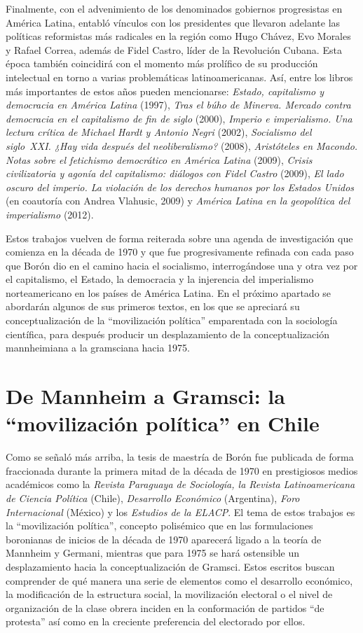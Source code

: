 {Finalmente, con el advenimiento de los denominados gobiernos progresistas en América Latina, entabló vínculos con los presidentes que llevaron adelante las políticas reformistas más radicales en la región como Hugo Chávez, Evo Morales y Rafael Correa, además de Fidel Castro, líder de la Revolución Cubana. Esta época también coincidirá con el momento más prolífico de su producción intelectual en torno a varias problemáticas latinoamericanas. Así, entre los libros más importantes de estos años pueden mencionarse: \emph{Estado, capitalismo y democracia en América Latina} (1997), \emph{Tras el búho de Minerva. Mercado contra democracia en el capitalismo de fin de siglo} (2000), \emph{Imperio e imperialismo. Una lectura crítica de Michael Hardt y Antonio Negri} (2002), \emph{Socialismo del siglo~XXI. ¿Hay vida después del neoliberalismo?} (2008), \emph{Aristóteles en Macondo. Notas sobre el fetichismo democrático en América Latina} (2009), \emph{Crisis civilizatoria y agonía del capitalismo: diálogos con Fidel Castro} (2009), \emph{El lado oscuro del imperio. La violación de los derechos humanos por los Estados Unidos} (en coautoría con Andrea Vlahusic, 2009) y \emph{América Latina en la geopolítica del imperialismo} (2012).

Estos trabajos vuelven de forma reiterada sobre una agenda de investigación que comienza en la década de 1970 y que fue progresivamente refinada con cada paso que Borón dio en el camino hacia el socialismo, interrogándose una y otra vez por el capitalismo, el Estado, la democracia y la injerencia del imperialismo norteamericano en los países de América Latina. En el próximo apartado se abordarán algunos de sus primeros textos, en los que se apreciará su conceptualización de la \enquote{movilización política} emparentada con la sociología científica, para después producir un desplazamiento de la conceptualización mannheimiana a la gramsciana hacia 1975.

\section{De Mannheim a Gramsci: la \enquote{movilización política} en Chile}

Como se señaló más arriba, la tesis de maestría de Borón fue publicada de forma fraccionada durante la primera mitad de la década de 1970 en prestigiosos medios académicos como la \emph{Revista Paraguaya de Sociología, la Revista Latinoamericana de Ciencia Política} (Chile), \emph{Desarrollo Económico} (Argentina), \emph{Foro Internacional} (México) y los \emph{Estudios de la ELACP}. El tema de estos trabajos es la \enquote{movilización política}, concepto polisémico que en las formulaciones boronianas de inicios de la década de 1970 aparecerá ligado a la teoría de Mannheim y Germani, mientras que para 1975 se hará ostensible un desplazamiento hacia la conceptualización de Gramsci. Estos escritos buscan comprender de qué manera una serie de elementos como el desarrollo económico, la modificación de la estructura social, la movilización electoral o el nivel de organización de la clase obrera inciden en la conformación de partidos \enquote{de protesta} así como en la creciente preferencia del electorado por ellos.

}
